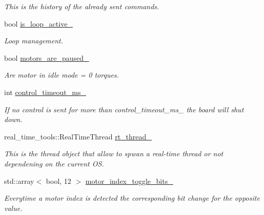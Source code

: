 \begin{DoxyCompactItemize}
\begin{DoxyCompactList}\small\item\em This is the history of the already sent commands. \end{DoxyCompactList}\item 
bool \hyperlink{classblmc__drivers_1_1SpiBus_acf6f61ce04098f05fd04971b477da07c}{is\+\_\+loop\+\_\+active\+\_\+}
\begin{DoxyCompactList}\small\item\em Loop management. \end{DoxyCompactList}\item 
bool \hyperlink{classblmc__drivers_1_1SpiBus_ab1ac8ef913898d20cc678f205e27662e}{motors\+\_\+are\+\_\+paused\+\_\+}\hypertarget{classblmc__drivers_1_1SpiBus_ab1ac8ef913898d20cc678f205e27662e}{}\label{classblmc__drivers_1_1SpiBus_ab1ac8ef913898d20cc678f205e27662e}

\begin{DoxyCompactList}\small\item\em Are motor in idle mode = 0 torques. \end{DoxyCompactList}\item 
int \hyperlink{classblmc__drivers_1_1SpiBus_ab861c026ce0d206b802ab521055885fd}{control\+\_\+timeout\+\_\+ms\+\_\+}\hypertarget{classblmc__drivers_1_1SpiBus_ab861c026ce0d206b802ab521055885fd}{}\label{classblmc__drivers_1_1SpiBus_ab861c026ce0d206b802ab521055885fd}

\begin{DoxyCompactList}\small\item\em If no control is sent for more than control\+\_\+timeout\+\_\+ms\+\_\+ the board will shut down. \end{DoxyCompactList}\item 
real\+\_\+time\+\_\+tools\+::\+Real\+Time\+Thread \hyperlink{classblmc__drivers_1_1SpiBus_aaae2fa36dfe60f6155cf8b010c16fc8f}{rt\+\_\+thread\+\_\+}\hypertarget{classblmc__drivers_1_1SpiBus_aaae2fa36dfe60f6155cf8b010c16fc8f}{}\label{classblmc__drivers_1_1SpiBus_aaae2fa36dfe60f6155cf8b010c16fc8f}

\begin{DoxyCompactList}\small\item\em This is the thread object that allow to spwan a real-\/time thread or not dependening on the current OS. \end{DoxyCompactList}\item 
std\+::array$<$ bool, 12 $>$ \hyperlink{classblmc__drivers_1_1SpiBus_a5805dd95171df8f26efdae85ea02662c}{motor\+\_\+index\+\_\+toggle\+\_\+bits\+\_\+}
\begin{DoxyCompactList}\small\item\em Everytime a motor index is detected the corresponding bit change for the opposite value. \end{DoxyCompactList}\end{DoxyCompactItemize}


